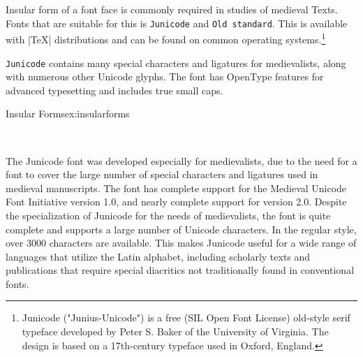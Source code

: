 Insular form of a font face is commonly required in studies
of medieval Texts. Fonts that are suitable for this is \texttt{Junicode} and \texttt{Old standard}. This is available with |TeX| distributions and can be found on common operating systems.\footnote{Junicode ("Junius-Unicode") is a free (SIL Open Font License) old-style serif typeface developed by Peter S. Baker of the University of Virginia. The design is based on a 17th-century typeface used in Oxford, England.}

\texttt{Junicode} contains many special characters and ligatures for medievalists, along with numerous other Unicode glyphs. The font has OpenType features for advanced typesetting and includes true small caps.

\begin{texexample}{Insular Forms}{ex:insularforms}
\bgroup
\huge
{}
\fox \\
\egroup

\bgroup
\huge
{}
\fox \\
\egroup
\end{texexample}

The Junicode font was developed especially for medievalists, due to the need for a font to cover the large number of special characters and ligatures used in medieval manuscripts. The font has complete support for the Medieval Unicode Font Initiative version 1.0, and nearly complete support for version 2.0.
Despite the specialization of Junicode for the needs of medievalists, the font is quite complete and supports a large number of Unicode characters. In the regular style, over 3000 characters are available. This makes Junicode useful for a wide range of languages that utilize the Latin alphabet, including scholarly texts and publications that require special diacritics not traditionally found in conventional fonts.

